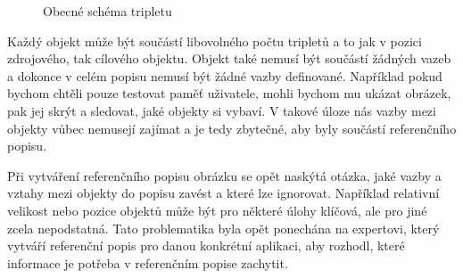 \begin{figure}[ht!]
	\centering
	\caption{Obecné schéma tripletu}\label{fig:schema_tripletu}
\end{figure}

Každý objekt může být součástí libovolného počtu tripletů a to jak v pozici zdrojového, tak cílového objektu.
Objekt také nemusí být součástí žádných vazeb a dokonce v celém popisu nemusí být žádné vazby definované.
Například pokud bychom chtěli pouze testovat paměť uživatele, mohli bychom mu ukázat obrázek, pak jej skrýt a sledovat, jaké objekty si vybaví.
V takové úloze nás vazby mezi objekty vůbec nemusejí zajímat a je tedy zbytečné, aby byly součástí referenčního popisu.

Při vytváření referenčního popisu obrázku se opět naskýtá otázka, jaké vazby a vztahy mezi objekty do popisu zavést a které lze ignorovat.
Například relativní velikost nebo pozice objektů může být pro některé úlohy klíčová, ale pro jiné zcela nepodstatná.
Tato problematika byla opět ponechána na expertovi, který vytváří referenční popis pro danou konkrétní aplikaci,
aby rozhodl, které informace je potřeba v referenčním popise zachytit.

